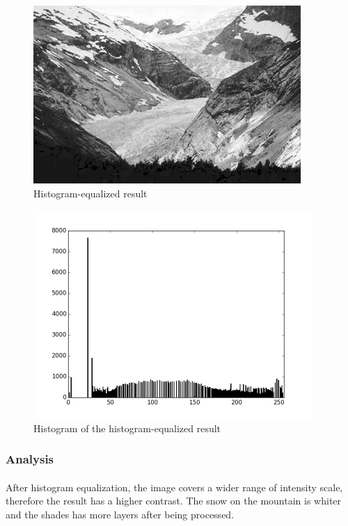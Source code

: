 \documentclass{article}
\begin{document}
\begin{figure}[H]
	\centering
	\includegraphics[width=288pt]{../result/equalize.png}
	\caption{Histogram-equalized result}
\end{figure}

\begin{figure}[H]
	\centering
	\includegraphics[width=300pt]{../result/hist-equalize.png}
	\caption{Histogram of the histogram-equalized result}
\end{figure}

\subsubsection{Analysis}

\paragraph{}
After histogram equalization, the image covers a wider range of intensity scale, therefore the result has a higher contrast. The snow on the mountain is whiter and the shades has more layers after being processed.
\end{document}
